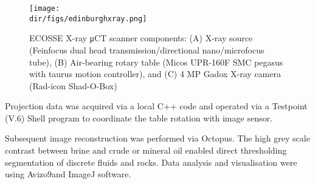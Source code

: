 \begin{figure}[htbp]
  \centering
  \texttt{[image: \\dir/figs/edinburghxray.png]}
  \caption{ECOSSE X-ray μCT scanner components: (A) X-ray source (Feinfocus dual head transmission/directional nano/microfocus tube), (B) Air-bearing rotary table (Micos UPR-160F SMC pegasus with taurus motion controller), and (C) 4 MP Gadox X-ray camera (Rad-icon Shad-O-Box)}
  \label{edinburghxray}
\end{figure}

Projection data was acquired via a local C++ code and operated via a Testpoint (V.6) Shell program to coordinate the table rotation with image sensor.

Subsequent image reconstruction was performed via Octopus\texttrademark. The high grey scale contrast between brine and crude or mineral oil enabled direct thresholding segmentation of discrete fluids and rocks. Data analysis and visualisation were using Avizo9\texttrademark and ImageJ software.

